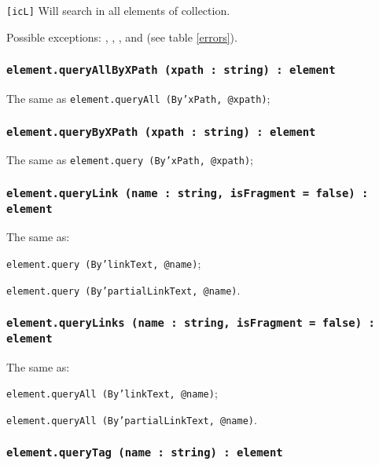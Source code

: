 \texttt{[icL]} Will search in all elements of collection.

Possible exceptions: , , ,  and  (see table \ref{errors}).

\subsubsection{\texttt{element.queryAllByXPath (xpath : string) : element}}

The same as \texttt{element.queryAll (By'xPath, @xpath)};

\subsubsection{\texttt{element.queryByXPath (xpath : string) : element}}

The same as \texttt{element.query (By'xPath, @xpath)};

\subsubsection{\texttt{element.queryLink (name : string, isFragment = false) : element}}

The same as:
\begin{icItems}
	\item \texttt{element.query (By'linkText, @name)};
	\item \texttt{element.query (By'partialLinkText, @name)}.
\end{icItems}

\subsubsection{\texttt{element.queryLinks (name : string, isFragment = false) : element}}

The same as:
\begin{icItems}
	\item \texttt{element.queryAll (By'linkText, @name)};
	\item \texttt{element.queryAll (By'partialLinkText, @name)}.
\end{icItems}

\subsubsection{\texttt{element.queryTag (name : string) : element}}

